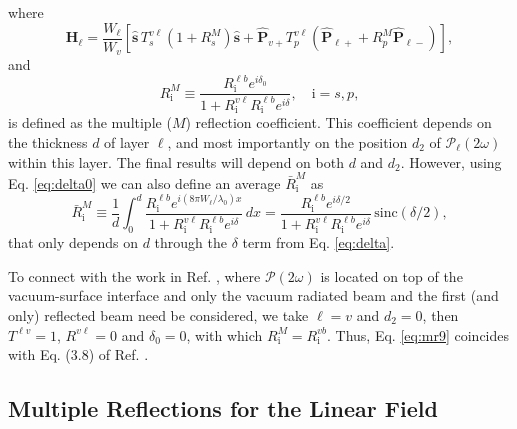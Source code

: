 where
\begin{equation}\label{eq:mr9}
\mathbf{H}_{\ell}
= \frac{W_\ell}{W_v}
\left[
\hat{\mathbf{s}}\,T_{s}^{v\ell}
\left(1+ R^{M}_{s}\right)\hat{\mathbf{s}} + \hat{\mathbf{P}}_{v+}T_{p}^{v\ell}
\left(\hat{\mathbf{P}}_{\ell +} + R^{M}_{p}\hat{\mathbf{P}}_{\ell -}\right)
\right],
\end{equation}
and
\begin{equation}\label{m61}
R^{M}_{\mathrm{i}}\equiv
\frac{R^{\ell b}_{\mathrm{i}}e^{i\delta_{0}}}
     {1+R^{v\ell}_{\mathrm{i}} R^{\ell b}_{\mathrm{i}}e^{i\delta}},
     \quad \mathrm{i}=s,p,
\end{equation}
is defined as the multiple ($M$) reflection coefficient. This coefficient
depends on the thickness $d$ of layer $\ell$, and most importantly on the
position $d_{2}$ of $\boldsymbol{\mathcal{P}}_{\ell}(2\omega)$ within this
layer. The final results will depend on both $d$ and $d_{2}$. However, using Eq.
\eqref{eq:delta0} we can also define an average $\bar{R}^{M}_{\mathrm{i}}$ as
\begin{equation}\label{eq:mcave}
\bar{R}^{M}_{\mathrm{i}}\equiv 
\frac{1}{d}\int_{0}^{d}
\frac{R^{\ell b}_{\mathrm{i}}e^{i(8\pi W_{\ell}/\lambda_{0})x}}
{1 + R^{v\ell}_{\mathrm{i}}R^{\ell b}_{\mathrm{i}}e^{i\delta}}\,dx
= \frac{R^{\ell b}_{\mathrm{i}}e^{i\delta/2}}
{1 + R^{v\ell}_{\mathrm{i}}R^{\ell b}_{\mathrm{i}}e^{i\delta}}
\,\mathrm{sinc}(\delta/2),
\end{equation}
that only depends on $d$ through the $\delta$ term from Eq. \eqref{eq:delta}.

To connect with the work in Ref. \cite{mizrahiJOSA88}, where
$\boldsymbol{\mathcal{P}}(2\omega)$ is located on top of the vacuum-surface
interface and only the vacuum radiated beam and the first (and only) reflected
beam need be considered, we take $\ell = v$ and $d_{2} = 0$, then $T^{\ell v} =
1$, $R^{v\ell} = 0$ and $\delta_{0} = 0$, with which $R^{M}_{\mathrm{i}} =
R^{vb}_{\mathrm{i}}$. Thus, Eq. \eqref{eq:mr9} coincides with Eq. (3.8) of Ref.
\cite{mizrahiJOSA88}.



\subsection{Multiple Reflections for the Linear Field}

